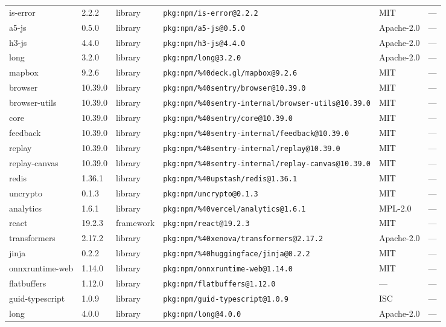 \documentclass[11pt]{article}
\begin{document}
\begin{longtable}{|l|l|l|p{2.2cm}|l|p{4cm}|}
is-error & 2.2.2 & library & \texttt{pkg:npm/is-error@2.2.2} & MIT & — \\
a5-js & 0.5.0 & library & \texttt{pkg:npm/a5-js@0.5.0} & Apache-2.0 & — \\
h3-js & 4.4.0 & library & \texttt{pkg:npm/h3-js@4.4.0} & Apache-2.0 & — \\
long & 3.2.0 & library & \texttt{pkg:npm/long@3.2.0} & Apache-2.0 & — \\
mapbox & 9.2.6 & library & \texttt{pkg:npm/\%40deck.gl/mapbox@9.2.6} & MIT & — \\
browser & 10.39.0 & library & \texttt{pkg:npm/\%40sentry/browser@10.39.0} & MIT & — \\
browser-utils & 10.39.0 & library & \texttt{pkg:npm/\%40sentry-internal/browser-utils@10.39.0} & MIT & — \\
core & 10.39.0 & library & \texttt{pkg:npm/\%40sentry/core@10.39.0} & MIT & — \\
feedback & 10.39.0 & library & \texttt{pkg:npm/\%40sentry-internal/feedback@10.39.0} & MIT & — \\
replay & 10.39.0 & library & \texttt{pkg:npm/\%40sentry-internal/replay@10.39.0} & MIT & — \\
replay-canvas & 10.39.0 & library & \texttt{pkg:npm/\%40sentry-internal/replay-canvas@10.39.0} & MIT & — \\
redis & 1.36.1 & library & \texttt{pkg:npm/\%40upstash/redis@1.36.1} & MIT & — \\
uncrypto & 0.1.3 & library & \texttt{pkg:npm/uncrypto@0.1.3} & MIT & — \\
analytics & 1.6.1 & library & \texttt{pkg:npm/\%40vercel/analytics@1.6.1} & MPL-2.0 & — \\
react & 19.2.3 & framework & \texttt{pkg:npm/react@19.2.3} & MIT & — \\
transformers & 2.17.2 & library & \texttt{pkg:npm/\%40xenova/transformers@2.17.2} & Apache-2.0 & — \\
jinja & 0.2.2 & library & \texttt{pkg:npm/\%40huggingface/jinja@0.2.2} & MIT & — \\
onnxruntime-web & 1.14.0 & library & \texttt{pkg:npm/onnxruntime-web@1.14.0} & MIT & — \\
flatbuffers & 1.12.0 & library & \texttt{pkg:npm/flatbuffers@1.12.0} & — & — \\
guid-typescript & 1.0.9 & library & \texttt{pkg:npm/guid-typescript@1.0.9} & ISC & — \\
long & 4.0.0 & library & \texttt{pkg:npm/long@4.0.0} & Apache-2.0 & — \\

\end{longtable}
\end{document}
